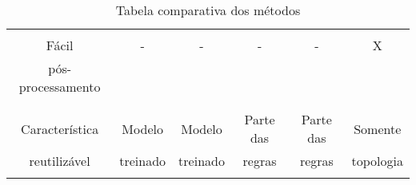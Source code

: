 \begin{table}
\begin{center}
\begin{tabular}{|c|c|c|c|c|c|}
      \hline
                        &      &           &          &              &            \\
      Fácil             &  -   &     -     &    -     &      -       &      X     \\
      pós-processamento &      &           &          &              &            \\
                        &      &           &          &              &            \\
      \hline
                        &          &          &           &           &          \\
      Característica    & Modelo   & Modelo   & Parte das & Parte das & Somente  \\
      reutilizável      & treinado & treinado & regras    & regras    & topologia\\
                        &          &          &           &           &          \\
      \hline
    \end{tabular}
  \caption{Tabela comparativa dos métodos}
  \label{regras}
  \end{center}
\end{table}
